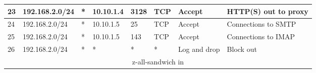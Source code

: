 \documentclass[a4paper, 11pt, oneside]{article}
\begin{document}
\begin{table}[H]
{\begin{tabular}{|llllllll|}
\multicolumn{1}{|l|}{23}                        & \multicolumn{1}{l|}{192.168.2.0/24}                                               & \multicolumn{1}{l|}{*}                                                              & \multicolumn{1}{l|}{10.10.1.4}                                                         & \multicolumn{1}{l|}{3128}                                                                & \multicolumn{1}{l|}{TCP}               & \multicolumn{1}{l|}{Accept}          & HTTP(S) out to proxy                   \\ \hline
\multicolumn{1}{|l|}{24}                        & \multicolumn{1}{l|}{192.168.2.0/24}                                               & \multicolumn{1}{l|}{*}                                                              & \multicolumn{1}{l|}{10.10.1.5}                                                        & \multicolumn{1}{l|}{25}                                                                  & \multicolumn{1}{l|}{TCP}               & \multicolumn{1}{l|}{Accept}          & Connections to SMTP                    \\ \hline
\multicolumn{1}{|l|}{25}                        & \multicolumn{1}{l|}{192.168.2.0/24}                                               & \multicolumn{1}{l|}{*}                                                              & \multicolumn{1}{l|}{10.10.1.5}                                                         & \multicolumn{1}{l|}{143}                                                                 & \multicolumn{1}{l|}{TCP}               & \multicolumn{1}{l|}{Accept}          & Connections to IMAP                    \\ \hline
\multicolumn{1}{|l|}{26}                        & \multicolumn{1}{l|}{192.168.2.0/24}                                               & \multicolumn{1}{l|}{*}                                                              & \multicolumn{1}{l|}{*}                                                                 & \multicolumn{1}{l|}{*}                                                                   & \multicolumn{1}{l|}{*}                 & \multicolumn{1}{l|}{Log and drop}    & Block out                              \\ \hline
\multicolumn{8}{|c|}{{\color[HTML]{FE0000} z-all-sandwich in}}                                                                                                                                                                                                                                                                                                                                                                                                                                                                         \\ \hline

\end{tabular}}
\end{table}
\end{document}
